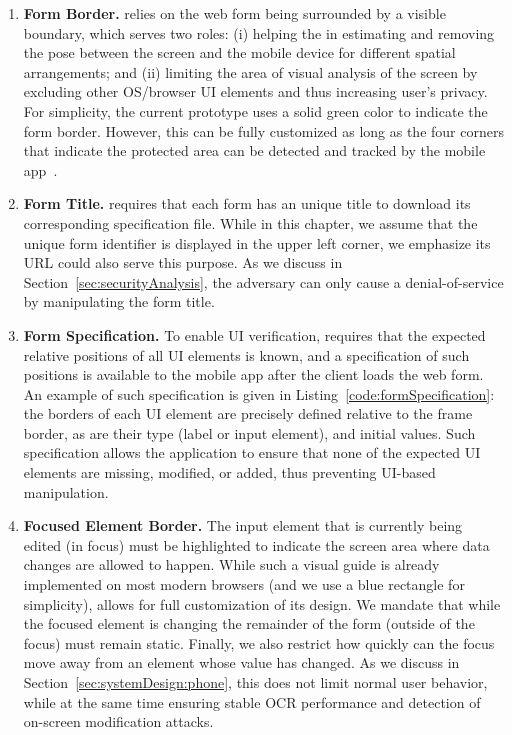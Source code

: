 \begin{enumerate}
	\item[\one] \textbf{Form Border.}
	\sysname relies on the web form being surrounded by a visible boundary, which serves two roles:
	(i) helping the \app in estimating and removing the pose between the screen and the mobile device for different spatial arrangements; and
	(ii) limiting the area of visual analysis of the screen by excluding other OS/browser UI elements and thus increasing user's privacy.
	For simplicity, the current prototype uses a solid green color to indicate the form border.
	However, this can be fully customized as long as the four corners that indicate the protected area can be detected and tracked by the mobile app~\cite{zhang2002visual}.


	\item[\two] \textbf{Form Title.} \sysname requires that each form has an unique title to download its corresponding specification file.
	While in this chapter, we assume that the unique form identifier is displayed in the upper left corner, we emphasize its URL could also serve this purpose.
	As we discuss in Section~\ref{sec:securityAnalysis}, the adversary can only cause a denial-of-service by manipulating the form title.

	\item[\three] \textbf{Form Specification.}
	To enable UI verification, \sysname requires that the expected relative positions of all UI elements is known, and a specification of such positions is available to the mobile app after the client loads the web form.
	An example of such specification is given in Listing~\ref{code:formSpecification}: the borders of each UI element are precisely defined relative to the frame border, as are their type (label or input element), and initial values.
	Such specification allows the application to ensure that none of the expected UI elements are missing, modified, or added, thus preventing UI-based manipulation.

	\item[\four] \textbf{Focused Element Border.}
	The input element that is currently being edited (in focus) must be highlighted to indicate the screen area where data changes are allowed to happen.
	While such a visual guide is already implemented on most modern browsers (and we use a blue rectangle for simplicity), \sysname allows for full customization of its design.
	We mandate that while the focused element is changing the remainder of the form (outside of the focus) must remain static.
	Finally, we also restrict how quickly can the focus move away from an element whose value has changed.
	As we discuss in Section~\ref{sec:systemDesign:phone}, this does not limit normal user behavior, while at the same time ensuring stable OCR performance and detection of on-screen modification attacks.


\end{enumerate}
